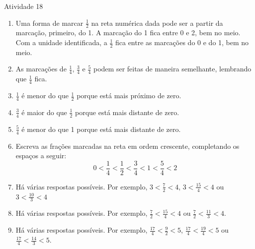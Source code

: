 \begin{multicols}{2}
  
\begin{resposta*}{Atividade 18}
  
\begin{center}
\end{center}
  
  
\begin{enumerate} [\quad a)] %
    \item       Uma forma de marcar       $\frac{1}{2}$       na reta numérica dada pode ser a partir da marcação, primeiro, do 1. A marcação do 1 fica entre 0 e 2, bem no meio. Com a unidade identificada, a       $\frac{1}{2}$        fica entre as marcações do 0 e do 1, bem no meio.   
    \item       As marcações de       $\frac{1}{4}$,       $\frac{3}{4}$       e       $\frac{5}{4}$       podem ser feitas de maneira semelhante, lembrando que       $\frac{1}{4}$       fica.
    \item             $\frac{1}{4}$       é menor do que       $\frac{1}{2}$       porque está mais próximo de zero.
    \item             $\frac{3}{4}$       é maior do que        $\frac{1}{2}$       porque está mais distante de zero.
    \item             $\frac{5}{4}$       é menor do que 1 porque está mais distante de zero.
    \item       Escreva as frações marcadas na reta em ordem crescente, completando os espaços a seguir:
  $$0 < \frac{1}{4} < \frac{1}{2}< \frac{3}{4} < 1 < \frac{5}{4} < 2$$     
    \item       Há várias respostas possíveis. Por exemplo,       $3 < \frac{7}{2} < 4$,       $3 < \frac{15}{4} < 4$         ou         $3 < \frac{10}{3} < 4$
    \item       Há várias respostas possíveis. Por exemplo,       $\frac{7}{2} < \frac{15}{4} < 4$ ou $\frac{7}{2} < \frac{11}{3} < 4$.
    \item       Há várias respostas possíveis. Por exemplo,       $\frac{17}{4} < \frac{9}{2} < 5$, $\frac{17}{4} < \frac{19}{4} < 5$ ou $\frac{17}{4} < \frac{14}{3} < 5$.
\end{enumerate} %
  
  
\end{resposta*}



\end{multicols}
